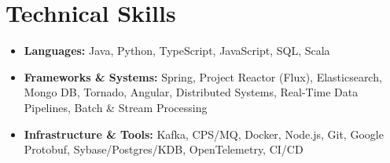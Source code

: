 \documentclass[letterpaper,11pt]{article}
\newcommand{\resumeSubHeadingListStart}{\begin{itemize}[leftmargin=*, label={}]}
\newcommand{\resumeSubHeadingListEnd}{\end{itemize}}
\begin{document}
\section{Technical Skills}
  \resumeSubHeadingListStart
    \item \small{\textbf{Languages:} Java, Python, TypeScript, JavaScript, SQL, Scala} \vspace{-4pt}
    \item \small{\textbf{Frameworks \& Systems:} Spring, Project Reactor (Flux), Elasticsearch, Mongo DB, Tornado, Angular, Distributed Systems, Real-Time Data Pipelines, Batch \& Stream Processing} \vspace{-4pt}
    \item \small{\textbf{Infrastructure \& Tools:} Kafka, CPS/MQ, Docker, Node.js, Git, Google Protobuf, Sybase/Postgres/KDB, OpenTelemetry, CI/CD}
  \resumeSubHeadingListEnd
\end{document}
